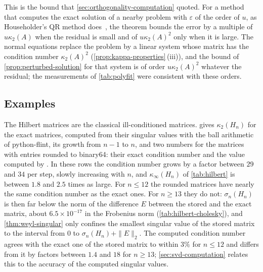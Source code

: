 This is the bound that \cref{sec:orthogonality-computation} quoted. For a method that computes the exact solution of a nearby problem with $\varepsilon$ of the order of $u$, as Householder's QR method does~\cite[Chap.~20]{higham2002accuracy}, the theorem bounds the error by a multiple of $u\kappa_2(A)$ when the residual is small and of $u\kappa_2(A)^2$ only when it is large. The normal equations replace the problem by a linear system whose matrix has the condition number $\kappa_2(A)^2$ (\cref{prop:kappa-properties}\,(iii)), and the bound of \cref{prop:perturbed-solution} for that system is of order $u\kappa_2(A)^2$ whatever the residual; the measurements of \cref{tab:polyfit} were consistent with these orders.

\subsection{Examples}

The Hilbert matrices are the classical ill-conditioned matrices.  gives $\kappa_2(H_n)$ for the exact matrices, computed from their singular values with the ball arithmetic of python-flint, its growth from $n-1$ to $n$, and two numbers for the matrices with entries rounded to binary64: their exact condition number and the value computed by . In these rows the condition number grows by a factor between $29$ and $34$ per step, slowly increasing with $n$, and $\kappa_\infty(H_n)$ of \cref{tab:hilbert} is between $1.8$ and $2.5$ times as large. For $n\le12$ the rounded matrices have nearly the same condition number as the exact ones. For $n\ge13$ they do not: $\sigma_n(H_n)$ is then far below the norm of the difference $E$ between the stored and the exact matrix, about $6.5\times10^{-17}$ in the Frobenius norm (\cref{tab:hilbert-cholesky}), and \cref{thm:weyl-singular} only confines the smallest singular value of the stored matrix to the interval from $0$ to $\sigma_n(H_n)+\|E\|_2$. The computed condition number agrees with the exact one of the stored matrix to within $3\%$ for $n\le12$ and differs from it by factors between $1.4$ and $18$ for $n\ge13$; \cref{sec:svd-computation} relates this to the accuracy of the computed singular values.

